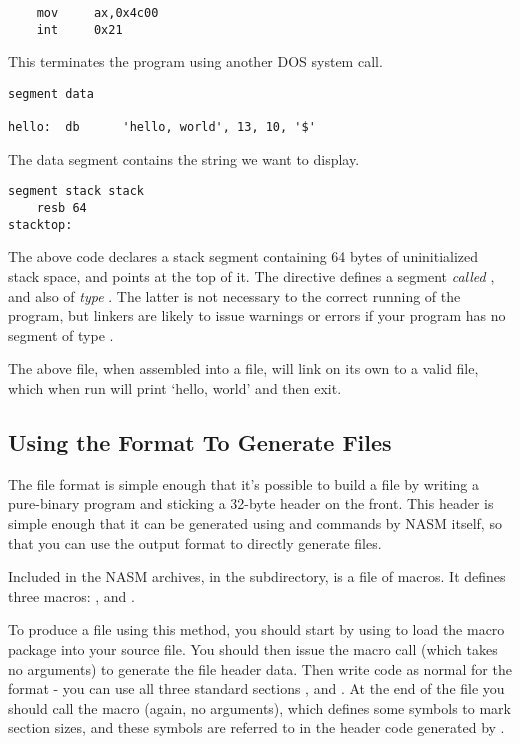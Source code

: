 \begin{lstlisting}
    mov     ax,0x4c00
    int     0x21
\end{lstlisting}

This terminates the program using another DOS system call.

\begin{lstlisting}
segment data

hello:  db      'hello, world', 13, 10, '$'
\end{lstlisting}

The data segment contains the string we want to display.

\begin{lstlisting}
segment stack stack
    resb 64
stacktop:
\end{lstlisting}

The above code declares a stack segment containing 64 bytes of
uninitialized stack space, and points  at the top of it.
The directive  defines a segment \emph{called}
, and also of \emph{type} . The latter is not
necessary to the correct running of the program, but linkers are
likely to issue warnings or errors if your program has no segment of
type .

The above file, when assembled into a  file, will link on
its own to a valid  file, which when run will print `hello,
world' and then exit.

\subsection{Using the  Format To Generate  Files}
\label{subsec:binexe}

The  file format is simple enough that it's possible to
build a  file by writing a pure-binary program and sticking
a 32-byte header on the front. This header is simple enough that it
can be generated using  and  commands by NASM itself,
so that you can use the  output format to directly generate
 files.

Included in the NASM archives, in the 
subdirectory, is a file  of macros. It defines three
macros: ,  and
.

To produce a  file using this method, you should start by
using  to load the  macro package into
your source file. You should then issue the  macro call
(which takes no arguments) to generate the file header data. Then
write code as normal for the  format - you can use all three
standard sections ,  and . At the end of
the file you should call the  macro (again, no arguments),
which defines some symbols to mark section sizes, and these symbols
are referred to in the header code generated by .

